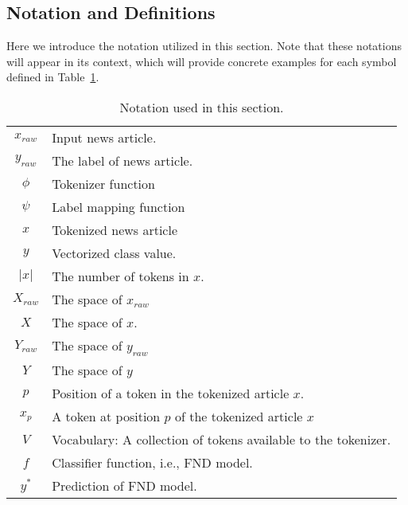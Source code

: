 \subsection{Notation and Definitions}
\label{subsec:newsContentModels_Definitions}
Here we introduce the notation utilized in this section. Note that these notations will appear in its context, which will provide concrete examples for each symbol defined in Table~\ref{tab:newsContentModels_Notation}.\\
\begin{table}
    \begin{tabular}{cp{}}
        $x_{raw}$ & Input news article.                                            \\
        $y_{raw}$ & The label of news article.                                     \\
        $\phi$    & Tokenizer function                                             \\
        $\psi$    & Label mapping function                                         \\
        $x$       & Tokenized news article                                         \\
        $y$       & Vectorized class value.                                        \\
        $|x|$     & The number of tokens in $x$.                                   \\
        $X_{raw}$ & The space of $x_{raw}$                                         \\
        $X$       & The space of $x$.                                              \\
        $Y_{raw}$ & The space of $y_{raw}$                                         \\
        $Y$       & The space of $y$                                               \\
        $p$       & Position of a token in the tokenized article $x$.              \\
        $x_p$     & A token at position $p$ of the tokenized article $x$           \\
        $V$       & Vocabulary: A collection of tokens available to the tokenizer. \\
        $f$       & Classifier function, i.e., FND model.                          \\
        $y^*$     & Prediction of FND model.                                       \\
    \end{tabular}
    \caption{\label{tab:newsContentModels_Notation}Notation used in this section.}
\end{table}
